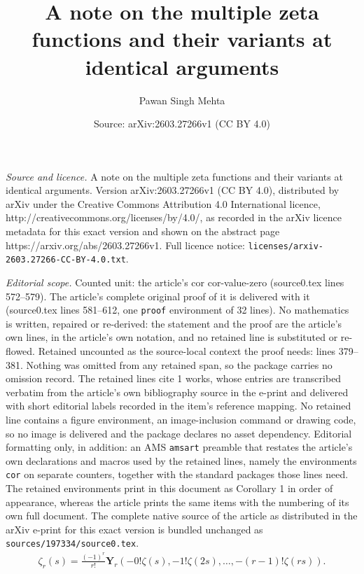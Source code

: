 \documentclass[10pt,a4paper]{amsart}
\title{A note on the multiple zeta functions and their variants at identical arguments}
\author{Pawan Singh Mehta}
\date{Source: arXiv:2603.27266v1 (CC BY 4.0)}
\begin{document}
\maketitle

\noindent\emph{Source and licence.} A note on the multiple zeta functions and their variants at identical arguments. Version arXiv:2603.27266v1 (CC BY 4.0), distributed by arXiv under the Creative Commons Attribution 4.0 International licence, http://creativecommons.org/licenses/by/4.0/, as recorded in the arXiv licence metadata for this exact version and shown on the abstract page https://arxiv.org/abs/2603.27266v1. Full licence notice: \texttt{licenses/arxiv-2603.27266-CC-BY-4.0.txt}.\par\smallskip

\noindent\textit{Editorial scope.} Counted unit: the article's cor cor-value-zero (source0.tex lines 572--579). The article's complete original proof of it is delivered with it (source0.tex lines 581--612, one \texttt{proof} environment of 32 lines). No mathematics is written, repaired or re-derived: the statement and the proof are the article's own lines, in the article's own notation, and no retained line is substituted or re-flowed.  Retained uncounted as the source-local context the proof needs: lines 379--381.  Nothing was omitted from any retained span, so the package carries no omission record.  The retained lines cite 1 works, whose entries are transcribed verbatim from the article's own bibliography source in the e-print and delivered with short editorial labels recorded in the item's reference mapping.  No retained line contains a figure environment, an image-inclusion command or drawing code, so no image is delivered and the package declares no asset dependency.  Editorial formatting only, in addition: an AMS \texttt{amsart} preamble that restates the article's own declarations and macros used by the retained lines, namely the environments \texttt{cor} on separate counters, together with the standard packages those lines need.  The retained environments print in this document as Corollary 1 in order of appearance, whereas the article prints the same items with the numbering of its own full document.  The complete native source of the article as distributed in the arXiv e-print for this exact version is bundled unchanged as \texttt{sources/197334/source0.tex}.
\begin{align}\label{eq-zeta}
\zeta_r(s)=\frac{(-1)^r}{r!}\mathbf{Y}_r\left(-0!\zeta(s), -1!\zeta(2s),\ldots,-(r-1)!\zeta(rs)\right).
\end{align}
\end{document}
